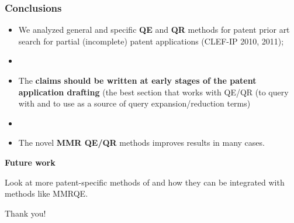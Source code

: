 \documentclass[xcolor=x11names,compress]{beamer}
\renewcommand{\(}{\begin{columns}}
\renewcommand{\)}{\end{columns}}
\newcommand{\<}[1]{\begin{column}{#1}}
\renewcommand{\>}{\end{column}}
\begin{document}
\begin{frame}
\frametitle{Conclusions}
\begin{itemize}

\item We analyzed general and specific \textbf{QE} and \textbf{QR} methods for
patent prior art search for partial (incomplete) patent applications
(CLEF-IP 2010, 2011);
\item[]
\item The \textbf{claims should be written at early stages of the
patent application drafting} (the best section that works with QE/QR (to query with and to use as a source of query expansion/reduction terms)
\item[]
\item The novel \textbf{MMR QE/QR} methods improves results in many cases. 
\end{itemize}


{\color{DeepSkyBlue4}\textbf{Future work}}

Look at more patent-specific methods of and how they
can be integrated with methods like MMRQE. 
\end{frame}


\begin{frame}
\begin{center}
{\huge Thank you!}
\end{center}
\end{frame}



 
\end{document}
